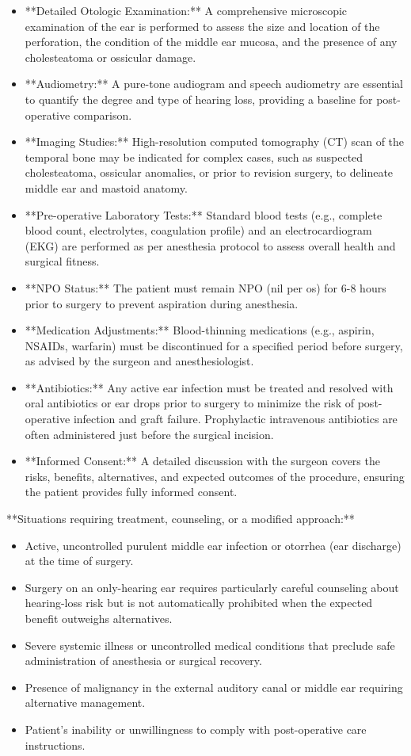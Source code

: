 \begin{itemize}
  \item **Detailed Otologic Examination:** A comprehensive microscopic examination of the ear is performed to assess the size and location of the perforation, the condition of the middle ear mucosa, and the presence of any cholesteatoma or ossicular damage.
  \item **Audiometry:** A pure-tone audiogram and speech audiometry are essential to quantify the degree and type of hearing loss, providing a baseline for post-operative comparison.
  \item **Imaging Studies:** High-resolution computed tomography (CT) scan of the temporal bone may be indicated for complex cases, such as suspected cholesteatoma, ossicular anomalies, or prior to revision surgery, to delineate middle ear and mastoid anatomy.
  \item **Pre-operative Laboratory Tests:** Standard blood tests (e.g., complete blood count, electrolytes, coagulation profile) and an electrocardiogram (EKG) are performed as per anesthesia protocol to assess overall health and surgical fitness.
  \item **NPO Status:** The patient must remain NPO (nil per os) for 6-8 hours prior to surgery to prevent aspiration during anesthesia.
  \item **Medication Adjustments:** Blood-thinning medications (e.g., aspirin, NSAIDs, warfarin) must be discontinued for a specified period before surgery, as advised by the surgeon and anesthesiologist.
  \item **Antibiotics:** Any active ear infection must be treated and resolved with oral antibiotics or ear drops prior to surgery to minimize the risk of post-operative infection and graft failure. Prophylactic intravenous antibiotics are often administered just before the surgical incision.
  \item **Informed Consent:** A detailed discussion with the surgeon covers the risks, benefits, alternatives, and expected outcomes of the procedure, ensuring the patient provides fully informed consent.
\end{itemize}

**Situations requiring treatment, counseling, or a modified approach:**

\begin{itemize}
  \item Active, uncontrolled purulent middle ear infection or otorrhea (ear discharge) at the time of surgery.
  \item Surgery on an only-hearing ear requires particularly careful counseling about hearing-loss risk but is not automatically prohibited when the expected benefit outweighs alternatives.
  \item Severe systemic illness or uncontrolled medical conditions that preclude safe administration of anesthesia or surgical recovery.
  \item Presence of malignancy in the external auditory canal or middle ear requiring alternative management.
  \item Patient's inability or unwillingness to comply with post-operative care instructions.
\end{itemize}

